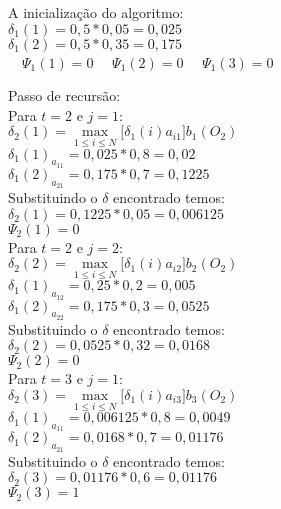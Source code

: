 A inicialização do algoritmo:\\
$\delta_1 (1) = 0,5 * 0,05 = 0,025$ \\
$\delta_1 (2) = 0,5 * 0,35 = 0,175$ \\

$\quad \Psi_1 (1) = 0$
$\quad \Psi_1 (2) = 0$
$\quad \Psi_1 (3) = 0$\\

\begin{multicols}{2}
Passo de recursão:\\

Para $t=2$ e $j = 1$:\\
$\displaystyle \delta_2 (1) = \max\limits_{1 \leq i \leq N} \Big[\delta_{1}(i) a_{i1} \Big]b_1 (O_2)$\\
$\delta_1(1)_{a_{11}} = 0,025 * 0,8 = 0,02$\\
$\delta_1(2)_{a_{21}} = 0,175 * 0,7 = 0,1225$ \\


Substituindo o $\delta$ encontrado temos:\\
$\delta_2(1) = 0,1225 * 0,05 = 0,006125$\\
$\Psi_2(1) = 0$\\

Para $t=2$ e $j = 2$:\\
$\displaystyle \delta_2 (2) = \max\limits_{1 \leq i \leq N} \Big[\delta_{1}(i) a_{i2} \Big]b_2 (O_2)$\\
$\delta_1(1)_{a_{12}} = 0,25 * 0,2 = 0,005$\\
$\delta_1(2)_{a_{22}} = 0,175 * 0,3 = 0,0525$\\ 


 
 Substituindo o $\delta$ encontrado temos:\\
$\delta_2(2) = 0,0525 * 0,32 = 0,0168$\\ 
$\Psi_2(2) = 0$\\

Para $t=3$ e $j = 1$:\\
$\displaystyle \delta_2 (3) = \max\limits_{1 \leq i \leq N} \Big[\delta_{1}(i) a_{i3} \Big]b_3 (O_2)$\\
$\delta_1(1)_{a_{11}} = 0,006125 * 0,8 = 0,0049$\\
$\delta_1(2)_{a_{21}} = 0,0168 * 0,7 = 0,01176$\\ 

 
 Substituindo o $\delta$ encontrado temos:\\
$\delta_2(3) = 0,01176 * 0,6 = 0,01176$\\ 
$\Psi_2(3) = 1$\\


\end{multicols}
